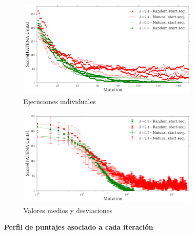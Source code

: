 \begin{figure}[htbp]
\advance\leftskip-1.5cm
  \begin{subfigure}[b]{\textwidth}
 \includegraphics[width=1.1\textwidth]{img/resultados/iterationVsScore-individual.png}
    \caption{Ejecuciones individuales}
    \label{fig:scoreVsiter-a}
  \end{subfigure}
  \begin{subfigure}[b]{\textwidth}
     \includegraphics[width=1.1\textwidth]{img/resultados/iterationVsScore-mean.png}
    \caption{Valores medios y desviaciones}
  \label{fig:scoreVsiter-b}
  \end{subfigure}
  \caption{\textbf{Perfil de puntajes asociado a cada iteración}}
  \label{fig:scoreVsiter}
\end{figure}






